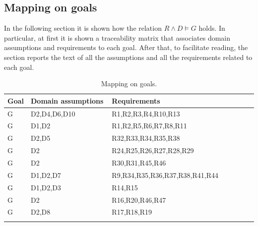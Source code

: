 \subsection{Mapping on goals}
\label{subsec: map_on_g}%
In the following section it is shown how the relation $R\land D \models G$ holds.
In particular, at first it is shown a traceability matrix that associates domain assumptions and requirements to each goal.
After that, to facilitate reading, the section reports the text of all the assumptions and all the requirements related to each goal.
\setcounter{mg}{1}
\newcommand{\cmg}{\themg\stepcounter{mg}}
\begin{center}
    \begin{longtable}{|p{0.06\linewidth}|p{0.34\linewidth}|p{0.6\linewidth}|}
        \hline
        \textbf{Goal} & \textbf{Domain assumptions}                       & \textbf{Requirements}                                                               \\
        \hline
        G\cmg         & D2,D4,D6,D10                & R1,R2,R3,R4,R10,R13\\
        \hline
        G\cmg         & D1,D2                       & R1,R2,R5,R6,R7,R8,R11\\
        \hline
        G\cmg         & D2,D5                       & R32,R33,R34,R35,R38\\
        \hline
        G\cmg         & D2                          & R24,R25,R26,R27,R28,R29\\
        \hline
        G\cmg         & D2                          & R30,R31,R45,R46\\
        \hline
        G\cmg         & D1,D2,D7                    & R9,R34,R35,R36,R37,R38,R41,R44\\
        \hline
        G\cmg         & D1,D2,D3                    & R14,R15\\
        \hline
        G\cmg         & D2                          & R16,R20,R46,R47\\
        \hline
        G\cmg         & D2,D8                       & R17,R18,R19\\
        \hline
        \caption{Mapping on goals.}
        \label{tab: map_on_g}%
    \end{longtable}
\end{center}

